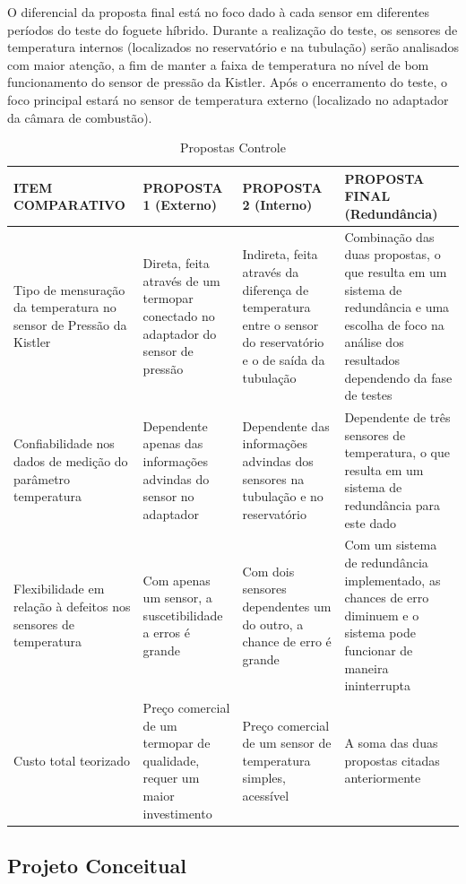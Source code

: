 O diferencial da proposta final está no foco dado à cada sensor em diferentes períodos do teste do foguete híbrido. Durante a realização do teste, os sensores de temperatura internos (localizados no reservatório e na tubulação) serão analisados com maior atenção, a fim de manter a faixa de temperatura no nível de bom funcionamento do sensor de pressão da Kistler. Após o encerramento do teste, o foco principal estará no sensor de temperatura externo (localizado no adaptador da câmara de combustão).
\newpage
\begin{table}[]
    \centering
    \begin{tabular}{|p{3cm}|p{3cm}|p{3cm}|p{3cm}|}
    \hline
    \textbf{ITEM COMPARATIVO} & \textbf{PROPOSTA 1 (Externo)}    & \textbf{PROPOSTA 2 (Interno)} & \textbf{PROPOSTA FINAL (Redundância)}  \\ \hline
    Tipo de mensuração da temperatura no sensor de Pressão da Kistler      & Direta, feita através de um termopar conectado no adaptador do sensor de pressão &  Indireta, feita através da diferença de temperatura entre o sensor do reservatório e o de saída da tubulação &  Combinação das duas propostas, o que resulta em um sistema de redundância e uma escolha de foco na análise dos resultados dependendo da fase de testes  \\ \hline
    Confiabilidade nos dados de medição do parâmetro temperatura & Dependente apenas das informações advindas do sensor no adaptador & Dependente das informações advindas dos sensores na tubulação e no reservatório & Dependente de três sensores de temperatura, o que resulta em um sistema de redundância para este dado \\ \hline
    Flexibilidade em relação à defeitos nos sensores de temperatura & Com apenas um sensor, a suscetibilidade a erros é grande & Com dois sensores dependentes um do outro, a chance de erro é grande & Com um sistema de redundância implementado, as chances de erro diminuem e o sistema pode funcionar de maneira ininterrupta \\ \hline
    Custo total teorizado & Preço comercial de um termopar de qualidade, requer um maior investimento & Preço comercial de um sensor de temperatura simples, acessível & A soma das duas propostas citadas anteriormente \\ \hline
    \end{tabular}
    \caption{Propostas Controle}
    \end{table}

\subsection{Projeto Conceitual}

